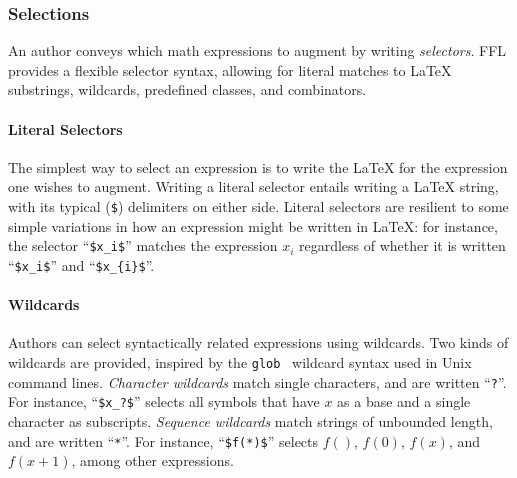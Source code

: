 \subsubsection{Selections}
An author conveys which math expressions to augment by writing \emph{selectors}. FFL provides a flexible selector syntax, allowing for literal matches to LaTeX substrings, wildcards, predefined classes, and combinators.



\paragraph{Literal Selectors} The simplest way to select an expression is to write the LaTeX for the expression one wishes to augment. Writing a literal selector entails writing a LaTeX string, with its typical (\texttt\$) delimiters on either side. Literal selectors are resilient to some simple variations in how an expression might be written in LaTeX: for instance, the selector ``\texttt{\$x\_i\$}'' matches the expression $x_i$ regardless of whether it is written ``\texttt{\$x\_i\$}'' and ``\texttt{\$x\_\{i\}\$}''.


\paragraph{Wildcards} Authors can select syntactically related expressions using wildcards. Two kinds of wildcards are provided, inspired by the \texttt{glob}~\cite{UnixMan} wildcard syntax used in Unix command lines. \emph{Character wildcards} match single characters, and are written ``\texttt{?}''. For instance, ``\texttt{\$x\_?\$}'' selects all symbols that have $x$ as a base and a single character as subscripts. \emph{Sequence wildcards} match strings of unbounded length, and are written ``\texttt{*}''. For instance, ``\texttt{\$f(*)\$}'' selects $f()$, $f(0)$, $f(x)$, and $f(x + 1)$, among other expressions. 


